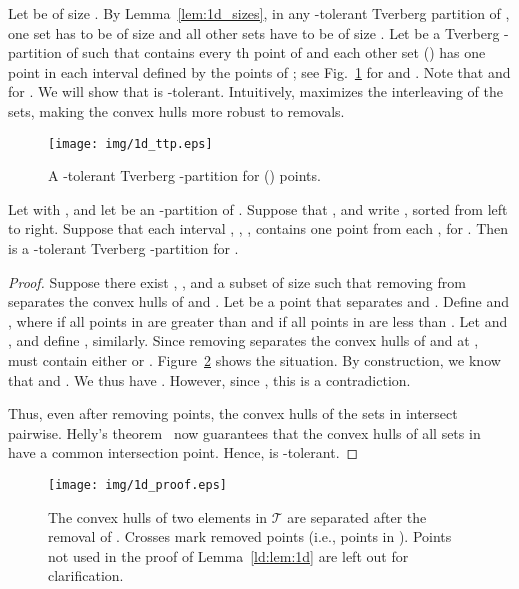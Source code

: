 \documentclass[oribibl,envcountsame,envcountsect]{llncs}
\newcommand{\mc}[1]{\ensuremath{\mathcal{#1}}}
\begin{document}
Let  be of size . By Lemma~\ref{lem:1d_sizes}, in any
-tolerant Tverberg partition of , one set has to be of size  and all
other sets have to be of size . Let  be
a Tverberg -partition of  such that  contains every th
point of  and each other set  () has one point in each interval
defined by the points of ; see Fig.~\ref{ld:fig:ttp} for  and .
Note that  and  for .
We will show that  is -tolerant.
Intuitively, 
maximizes the interleaving of the sets, making the convex hulls more
robust to removals.

\begin{figure}[htbp]
  \begin{center}
    \texttt{[image: img/1d\_ttp.eps]}
  \end{center}
  \caption{A -tolerant Tverberg -partition for  ()
    points.}
  \label{ld:fig:ttp}
\end{figure}

\begin{lemma}
  \label{ld:lem:1d}
  Let  with , and let
   be an -partition of .
  Suppose that , and write , sorted
  from left to right. Suppose that each interval ,
  , , contains one point
  from each , for . Then 
  is a -tolerant Tverberg -partition for .
\end{lemma}
\begin{proof}
  Suppose there exist , , and a subset  of size  such that removing   from  separates the convex hulls of
   and .  Let  be a point that separates 
  and .  Define  and
  , where  if all points in 
  are greater than  and  if all points in  are less than .
  Let  and , and define ,  similarly.
  Since removing  separates the convex hulls of  and  at , 
  must contain either  or . Figure~\ref{ld:fig:lem1dproof} shows the situation. By
  construction, we know that  and . We
  thus have . However, since
  , this is a contradiction.

  Thus, even after removing  points, the convex hulls of the sets in 
  intersect pairwise. Helly's theorem~\cite{Matouvsek2002} now
  guarantees that the convex hulls of all sets in  have a common
  intersection point. Hence,  is -tolerant.
\end{proof}

\begin{figure}[htbp]
  \begin{center}
    \texttt{[image: img/1d\_proof.eps]}
  \end{center}
  \caption{The convex hulls of two elements in \mc{T} are separated after the
    removal of . Crosses mark removed points (i.e., points in ).
    Points not used in the proof of Lemma~\ref{ld:lem:1d} are left out for
    clarification.}
  \label{ld:fig:lem1dproof}
\end{figure}
\end{document}
